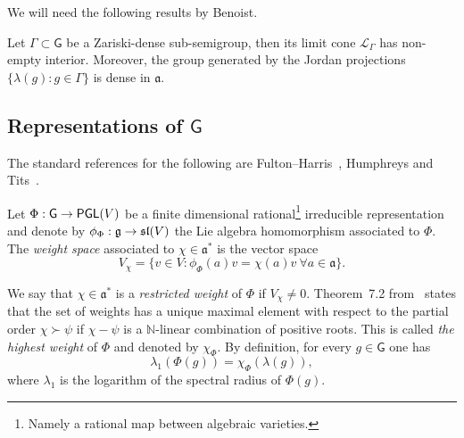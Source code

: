 \documentclass[AHL,Unicode,longabstracts,MathTools]{cedram}
\DeclareMathOperator{\PGL}{{\mathsf{PGL}}}
\renewcommand{\sf}[1]{{\mathsf{#1}}}
\newcommand{\sfG}{\sf{G}}
\newcommand{\cal}{\mathcal}
\newcommand{\N}{\mathbb{N}}
\newcommand{\Fund}{\Phi}
\renewcommand{\/}{\backslash}
\newcommand{\<}{\langle}
\renewcommand{\>}{\rangle}
\renewcommand{\ge}{\mathfrak{g}}
\renewcommand{\a}{\mathfrak{a}}
\newcommand{\fksl}{\mathfrak{sl}}
\renewcommand*{\to}{\mathchoice{\longrightarrow}{\rightarrow}{\rightarrow}{\rightarrow}}
\let\oldforall\forall
\renewcommand*{\forall}{\mathrel{\oldforall}}
\begin{document}
We will need the following results by Benoist.

\begin{theo}\label{densidad}
Let $\Gamma\subset\sfG$ be a Zariski-dense sub-semigroup, then its limit cone $\cal L_\Gamma$ has non-empty interior. Moreover, the group generated by the Jordan projections $\{\lambda(g):g\in\Gamma\}$ is dense in $\a$.
\end{theo}



\subsection{Representations of \texorpdfstring{$\sfG$}{sf G}}\label{representaciones}
The standard references for the following are Fulton--Harris~\cite{FultonHarris}, Humphreys \cite{james} and Tits~\cite{Tits}.



Let $\Fund:\sfG\to\PGL(V)$ be a finite dimensional rational\footnote{Namely a rational map between algebraic varieties.} irreducible representation and denote by $\phi_\Fund:\ge\to\fksl(V)$ the Lie algebra homomorphism associated to $\Fund$. The \emph{weight space} associated to $\chi\in\a^*$ is the vector space
\[
V_\chi=\{v\in V:\phi_\Fund(a) v=\chi(a) v\ \forall a\in\a \}.
\]

\noindent We say that $\chi\in\a^*$ is a \emph{restricted weight} of $\Fund$ if $V_\chi\neq0$. Theorem~7.2 from~\cite{Tits} states that the set of weights has a unique maximal element with respect to the partial order $\chi\succ\psi$ if $\chi-\psi$ is a $\N$-linear combination of positive roots. This is called \emph{the highest weight} of $\Fund$ and denoted by $\chi_\Fund$. By definition, for every $g\in\sfG$ one has
\begin{equation}\label{eq:spectralrep}
\lambda_1(\Fund(g))=\chi_\Fund(\lambda(g)),
\end{equation}
where $\lambda_1$ is the logarithm of the spectral radius of $\Fund(g)$.
\end{document}
